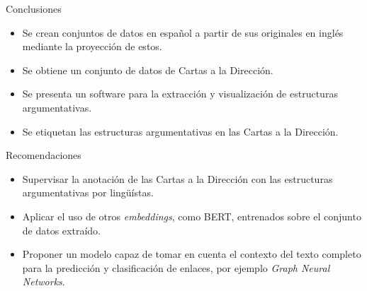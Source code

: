 \documentclass{beamer}
\begin{document}
\begin{frame}{Conclusiones}
    \begin{itemize}
        \item Se crean conjuntos de datos en español a partir de sus originales en inglés mediante la proyección de estos.
        \pause
        \item Se obtiene un conjunto de datos de Cartas a la Dirección.
        \pause
        \item Se presenta un software para la extracción y visualización de estructuras argumentativas.
        \pause
        \item Se etiquetan las estructuras argumentativas en las Cartas a la Dirección.
    \end{itemize}
\end{frame}

\begin{frame}{Recomendaciones}
    \begin{itemize}
        \item<1-> Supervisar la anotación de las Cartas a la Dirección con las estructuras argumentativas por lingüístas.
        \item<2-> Aplicar el uso de otros \textit{embeddings}, como BERT, entrenados sobre el conjunto 
        de datos extraído.
        \item<3-> Proponer un modelo capaz de tomar en cuenta el contexto del texto completo para la
        predicción y clasificación de enlaces, por ejemplo \textit{Graph Neural Networks}.
    \end{itemize}    
\end{frame}

\begin{frame}
    \titlepage 
\end{frame}
\logo{}
\end{document}
